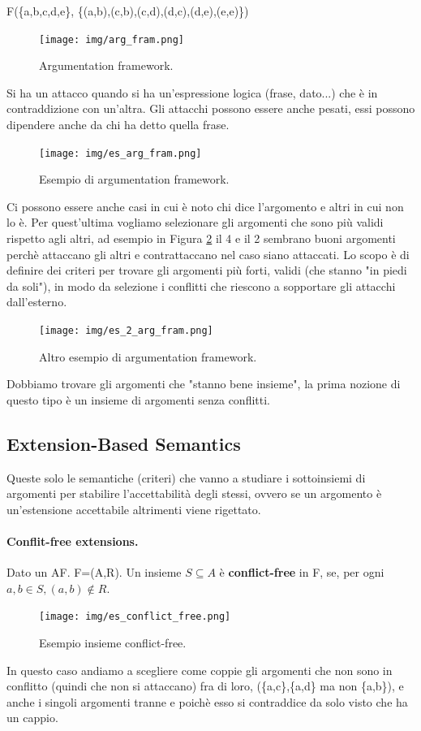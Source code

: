 \begin{center}
    F(\{a,b,c,d,e\}, \{(a,b),(c,b),(c,d),(d,c),(d,e),(e,e)\})
\end{center}
\begin{figure}[H]
    \centering
    \texttt{[image: img/arg\_fram.png]}
    \caption{Argumentation framework.}\label{fig:arg_fram}
\end{figure}
Si ha un attacco quando si ha un'espressione logica (frase, dato...) che è in contraddizione con un'altra. Gli attacchi possono essere anche pesati, essi possono dipendere anche da chi ha detto quella frase.
\begin{figure}[H]
    \centering
    \texttt{[image: img/es\_arg\_fram.png]}
    \caption{Esempio di argumentation framework.}\label{fig:es_arg_fram}
\end{figure}
Ci possono essere anche casi in cui è noto chi dice l'argomento e altri in cui non lo è. Per quest'ultima vogliamo selezionare gli argomenti che sono più validi rispetto agli altri, ad esempio in Figura \ref{fig:es_arg_fram} il 4 e il 2 sembrano buoni argomenti perchè attaccano gli altri e contrattaccano nel caso siano attaccati. Lo scopo è di definire dei criteri per trovare gli argomenti più forti, validi (che stanno "in piedi da soli"), in modo da selezione i conflitti che riescono a sopportare gli attacchi dall'esterno. 
\begin{figure}[H]
    \centering
    \texttt{[image: img/es\_2\_arg\_fram.png]}
    \caption{Altro esempio di argumentation framework.}\label{fig:es_2_arg_fram}
\end{figure}
Dobbiamo trovare gli argomenti che "stanno bene insieme", la prima nozione di questo tipo è un insieme di argomenti senza conflitti. 

\subsection{Extension-Based Semantics}
Queste solo le semantiche (criteri) che vanno a studiare i sottoinsiemi di argomenti per stabilire l'accettabilità degli stessi, ovvero se un argomento è un'estensione accettabile altrimenti viene rigettato.

\paragraph{Conflit-free extensions.} Dato un AF. F=(A,R). Un insieme $S\subseteq A$ è \textbf{conflict-free} in F, se, per ogni $a,b \in S ,(a,b) \notin R$.
\begin{figure}[H]
    \centering
    \texttt{[image: img/es\_conflict\_free.png]}
    \caption{Esempio insieme conflict-free.}\label{fig:es_conflict_free}
\end{figure}
In questo caso andiamo a scegliere come coppie gli argomenti che non sono in conflitto (quindi che non si attaccano) fra di loro, (\{a,c\},\{a,d\} ma non \{a,b\}), e anche i singoli argomenti tranne e poichè esso si contraddice da solo visto che ha un cappio. 

